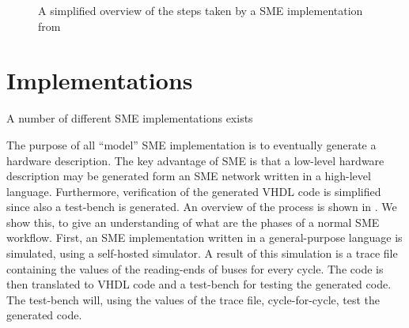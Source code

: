 \begin{figure}
  \centering
    \caption{A simplified overview of the steps taken by a SME implementation
      from  }
  \label{fig:smeflow}
\end{figure}

\section{Implementations}
A number of different SME implementations exists

The purpose of all ``model'' SME implementation is to eventually generate a
hardware description. The key advantage of SME is that a low-level hardware
description may be generated form an SME network written in a high-level
language. Furthermore, verification of the generated VHDL code is simplified
since also a test-bench is generated. An overview of the process is shown in
. We show this, to give an understanding of what are the
phases of a normal SME workflow. First, an SME implementation written in a
general-purpose language is simulated, using a self-hosted simulator. A result
of this simulation is a trace file containing the values of the reading-ends of
buses for every cycle. The code is then translated to VHDL code and a test-bench
for testing the generated code. The test-bench will, using the values of the
trace file, cycle-for-cycle, test the generated code.

